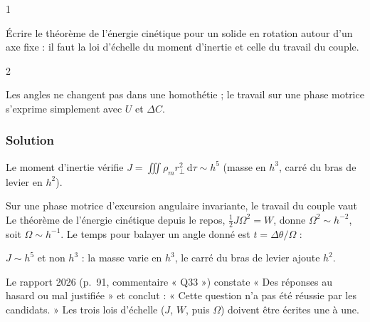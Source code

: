 \documentclass[11pt,a4paper]{article}
\newcommand{\equationajustee}[1]{%
  \sbox{\boiteequation}{$\displaystyle #1$}%
  \ifdim\wd\boiteequation>\linewidth
    \[\resizebox{\linewidth}{!}{\usebox{\boiteequation}}\]%
  \else
    \[#1\]%
  \fi}
\begin{document}
\begin{indication}{1}

Écrire le théorème de l'énergie cinétique pour un solide en rotation autour d'un axe fixe : il faut la loi d'échelle du moment d'inertie et celle du travail du couple.

\end{indication}

\begin{indication}{2}

Les angles ne changent pas dans une homothétie ; le travail sur une phase motrice s'exprime simplement avec \(U\) et \(\Delta C\).

\end{indication}

\hypertarget{solution-33}{%
\subsubsection{Solution}\label{solution-33}}

Le moment d'inertie vérifie \(J=\iiint\rho_mr_\perp^2\,\mathrm d\tau\sim h^5\) (masse en \(h^3\), carré du bras de levier en \(h^2\)).

Sur une phase motrice d'excursion angulaire invariante, le travail du couple vaut
\equationajustee{\begin{aligned}
W&=\int\Gamma\,\mathrm d\theta_{\mathrm r}\\
&=\frac12U^2\Delta C\\
&\sim h^3
\end{aligned}}
Le théorème de l'énergie cinétique depuis le repos, \(\tfrac12J\Omega^2=W\), donne \(\Omega^2\sim h^{-2}\), soit \(\Omega\sim h^{-1}\). Le temps pour balayer un angle donné est \(t=\Delta\theta/\Omega\) :
\equationajustee{\boxed{t\sim h}}

\begin{piege}

\(J\sim h^5\) et non \(h^3\) : la masse varie en \(h^3\), le carré du bras de levier ajoute \(h^2\).

\end{piege}

\begin{jury}

Le rapport 2026 (p.~91, commentaire « Q33 ») constate « Des réponses au hasard ou mal justifiée » et conclut : « Cette question n'a pas été réussie par les candidats. » Les trois lois d'échelle (\(J\), \(W\), puis \(\Omega\)) doivent être écrites une à une.

\end{jury}
\end{document}
